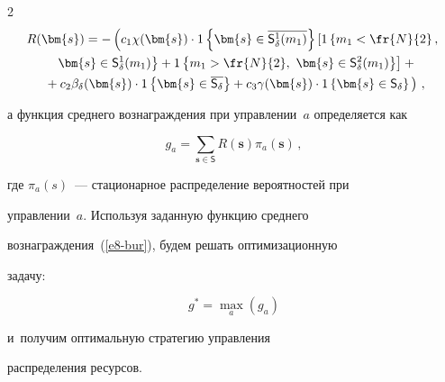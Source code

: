 \begin{multicols}{2}
  \begin{multline}


  R(\bm{s}) =-\left( c_1\chi(\bm{s}) \cdot {1}\left\{ \bm{s}\in 


\overline{\mathsf{S}_\delta^1(m_1)} \right\} \left[  1\left\{ m_1<\fr{N}{2}\,,\right.\right.\right.\hspace*{-2.6706pt}\\\ 


\left.\left.\bm{s}\in \mathsf{S}_\delta^1(m_1)\right\}+


1\left\{ m_1>\fr{N}{2},\ \bm{s}\in 


\mathsf{S}_\delta^2(m_1)\right\}\right] +{}\\


\left.{}+c_2\beta_\delta(\bm{s}) \cdot 1\left\{ 


\bm{s}\in \overline{\mathsf{S}_\delta}\right\} +c_3\gamma(\bm{s})\cdot 1\left\{ 


\bm{s}\in \mathsf{S}_\delta\right\}


\vphantom{\fr{N}{2}}


\right)\,,


  \label{e7-bur}


\end{multline}


а функция среднего вознаграждения при управлении~$a$ определяется как 


\begin{equation}


g_a= \sum\limits_{\bm{s}\in \mathsf{S}} R(\bm{s}) \pi_a(\bm{s})\,,


\label{e8-bur}


\end{equation}


где $\pi_a(s)$~--- стационарное распределение вероятностей при 


управлении~$a$. Используя заданную функцию среднего 


вознаграждения~(\ref{e8-bur}), будем решать оптимизационную 


задачу:


\begin{equation}


  g^*=\max\limits_a \left( g_a\right)


  \label{e9-bur}


  \end{equation}


и~получим оптимальную стратегию управления 


распределения ресурсов. 






\end{multicols}
